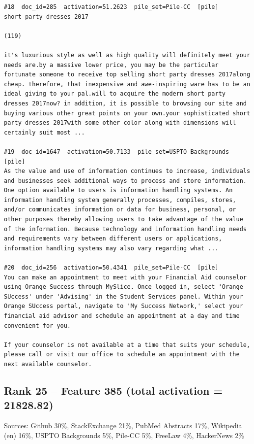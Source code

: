 \begin{verbatim}
#18  doc_id=285  activation=51.2623  pile_set=Pile-CC  [pile]
short party dresses 2017

(119)

it's luxurious style as well as high quality will definitely meet your needs are.by a massive lower price, you may be the particular fortunate someone to receive top selling short party dresses 2017along cheap. therefore, that inexpensive and awe-inspiring ware has to be an ideal giving to your pal.will to acquire the modern short party dresses 2017now? in addition, it is possible to browsing our site and buying various other great points on your own.your sophisticated short party dresses 2017with some other color along with dimensions will certainly suit most ...

#19  doc_id=1647  activation=50.7133  pile_set=USPTO Backgrounds  [pile]
As the value and use of information continues to increase, individuals and businesses seek additional ways to process and store information. One option available to users is information handling systems. An information handling system generally processes, compiles, stores, and/or communicates information or data for business, personal, or other purposes thereby allowing users to take advantage of the value of the information. Because technology and information handling needs and requirements vary between different users or applications, information handling systems may also vary regarding what ...

#20  doc_id=256  activation=50.4341  pile_set=Pile-CC  [pile]
You can make an appointment to meet with your Financial Aid counselor using Orange Success through MySlice. Once logged in, select 'Orange SUccess' under 'Advising' in the Student Services panel. Within your Orange SUccess portal, navigate to 'My Success Network,' select your financial aid advisor and schedule an appointment at a day and time convenient for you.

If your counselor is not available at a time that suits your schedule, please call or visit our office to schedule an appointment with the next available counselor.

\end{verbatim}

\subsection*{Rank 25 -- Feature 385 (total activation = 21828.82)}

Sources: Github 30\%, StackExchange 21\%, PubMed Abstracts 17\%, Wikipedia (en) 16\%, USPTO Backgrounds 5\%, Pile-CC 5\%, FreeLaw 4\%, HackerNews 2\%

